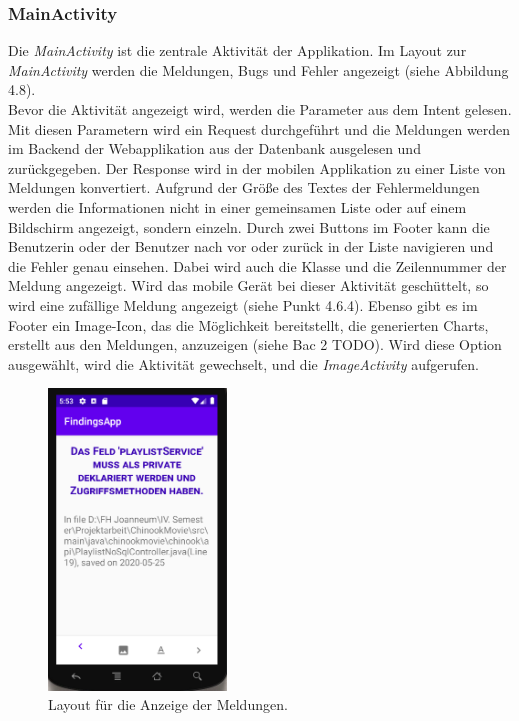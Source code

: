 \subsubsection{MainActivity}
Die \textit{MainActivity} ist die zentrale Aktivität der Applikation. Im Layout zur \textit{MainActivity} werden die Meldungen, Bugs und Fehler angezeigt (siehe Abbildung 4.8). \\ Bevor die Aktivität angezeigt wird, werden die Parameter aus dem Intent gelesen. Mit diesen Parametern wird ein Request durchgeführt und die Meldungen werden im Backend der Webapplikation aus der Datenbank ausgelesen und zurückgegeben. Der Response wird in der mobilen Applikation zu einer Liste von Meldungen konvertiert. Aufgrund der Größe des Textes der Fehlermeldungen werden die Informationen nicht in einer gemeinsamen Liste oder auf einem Bildschirm angezeigt, sondern einzeln. Durch zwei Buttons im Footer kann die Benutzerin oder der Benutzer  nach vor oder zurück in der Liste navigieren und die Fehler genau einsehen. Dabei wird auch die Klasse und die Zeilennummer der Meldung angezeigt. Wird das mobile Gerät bei dieser Aktivität geschüttelt, so wird eine zufällige Meldung angezeigt (siehe Punkt 4.6.4). Ebenso gibt es im Footer ein Image-Icon, das die Möglichkeit bereitstellt, die generierten Charts, erstellt aus den Meldungen, anzuzeigen (siehe Bac 2 TODO). Wird diese Option ausgewählt, wird die Aktivität gewechselt, und die \textit{ImageActivity} aufgerufen.
\begin{figure}[tp]
  \centering
  \includegraphics[height=8cm]{images/androidFindingScreen.PNG}
 \caption[Layout für die Anzeige der Meldungen.]{Layout für die Anzeige der Meldungen.}
  \label{fig:findingsInIDE}
\end{figure}

